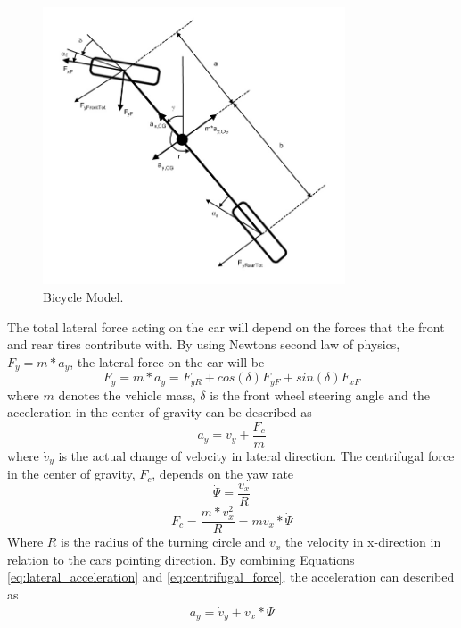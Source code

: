 \begin{figure}[h]
	\centering
	\includegraphics[width=0.8\textwidth]{Pictures/bicycle_model}
	\caption {Bicycle Model. \cite{fordonsdynamik99}}
	\label{bicycle_model}
\end{figure}

The total lateral force acting on the car will depend on the forces that the front and rear tires contribute with. By using Newtons second law of physics, $ F_{y} = m*a_{y} $, the lateral force on the car will be
\begin{equation} \label{eq:lateral_force}
	F_{y} = m*a_{y} = F_{yR} + cos(\delta)F_{yF} + sin(\delta)F_{xF} 
\end{equation}
where $ m $ denotes the vehicle mass, $ \delta $ is the front wheel steering angle and the acceleration in the center of gravity can be described as 
\begin{equation} \label{eq:lateral_acceleration}
	a_{y} = \dot v_{y} + \dfrac{F_{c}}{m}
\end{equation}
where $ \dot v_{y} $ is the actual change of velocity in lateral direction. The centrifugal force in the center of gravity, $ F_{c} $, depends on the yaw rate
\begin{equation} \label{eq:yaw_rate}
	\dot \Psi = \dfrac{v_{x}}{R}
\end{equation}
\begin{equation} \label{eq:centrifugal_force}
	F_{c} = \dfrac{m*v^2_{x}}{R} = mv_{x}*\dot \Psi
\end{equation}
Where $ R $ is the radius of the turning circle and $ v_{x} $ the velocity in x-direction in relation to the cars pointing direction. By combining Equations \ref{eq:lateral_acceleration} and \ref{eq:centrifugal_force}, the acceleration can described as
\begin{equation} \label{eq:lateral_acceleration_2}
	a_{y} = \dot v_{y} + v_{x}*\dot \Psi
\end{equation}

